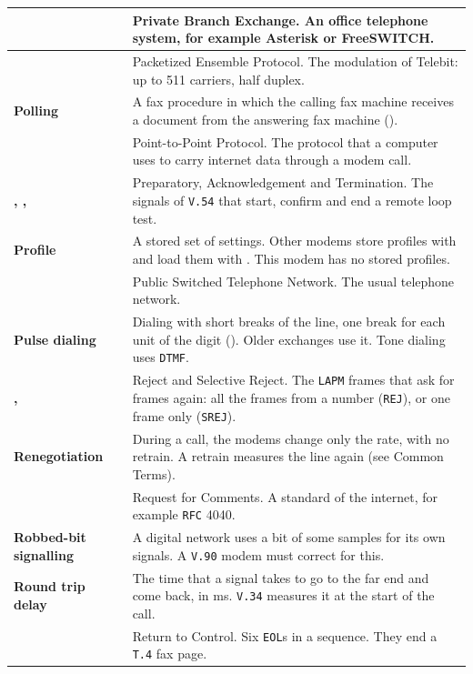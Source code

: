 \documentclass[a5paper,10pt]{article}
\makeatletter
\newcommand{\cmd}[1]{\texttt{#1}}
\newcommand{\std}[1]{\texttt{#1}}
\newcommand{\stdb}[1]{\textpdfrender{TextRenderingMode=FillStroke,
  LineWidth=0.25pt}{\texttt{#1}}}
\newcommand{\cmdl}[2][]{\hyperlink{cmd:#1}{\cmd{#2}}}
\let\cmd\@firstofone
\makeatother
\begin{document}
{\begin{longtable}{|>{\raggedright\arraybackslash}p{}|>{\raggedright\arraybackslash}p{}|}
\textbf{\stdb{PBX}} & Private Branch Exchange.  An office telephone system, for example Asterisk or FreeSWITCH. \\ \hline
\textbf{\stdb{PEP}} & Packetized Ensemble Protocol.  The modulation of Telebit: up to 511 carriers, half duplex. \\ \hline
\textbf{Polling} & A fax procedure in which the calling fax machine receives a document from the answering fax machine (\cmdl[plusFLP]{+FSP}). \\ \hline
\textbf{\stdb{PPP}} & Point-to-Point Protocol.  The protocol that a computer uses to carry internet data through a modem call. \\ \hline
\textbf{\stdb{PREP}, \stdb{ACK}, \stdb{TERM}} & Preparatory, Acknowledgement and Termination.  The signals of \std{V.54} that start, confirm and end a remote loop test. \\ \hline
\textbf{Profile} & A stored set of settings.  Other modems store profiles with \cmdl[ampW]{\&W} and load them with \cmdl[Z]{ATZ}.  This modem has no stored profiles. \\ \hline
\textbf{\stdb{PSTN}} & Public Switched Telephone Network.  The usual telephone network. \\ \hline
\textbf{Pulse dialing} & Dialing with short breaks of the line, one break for each unit of the digit (\cmdl[P]{P}).  Older exchanges use it.  Tone dialing uses \std{DTMF}. \\ \hline
\textbf{\stdb{REJ}, \stdb{SREJ}} & Reject and Selective Reject.  The \std{LAPM} frames that ask for frames again: all the frames from a number (\std{REJ}), or one frame only (\std{SREJ}). \\ \hline
\textbf{Renegotiation} & During a call, the modems change only the rate, with no retrain.  A retrain measures the line again (see Common Terms). \\ \hline
\textbf{\stdb{RFC}} & Request for Comments.  A standard of the internet, for example \std{RFC} 4040. \\ \hline
\textbf{Robbed-bit signalling} & A digital network uses a bit of some samples for its own signals.  A \std{V.90} modem must correct for this. \\ \hline
\textbf{Round trip delay} & The time that a signal takes to go to the far end and come back, in ms.  \std{V.34} measures it at the start of the call. \\ \hline
\textbf{\stdb{RTC}} & Return to Control.  Six \std{EOL}s in a sequence.  They end a \std{T.4} fax page. \\ \hline

\end{longtable}}
\end{document}
